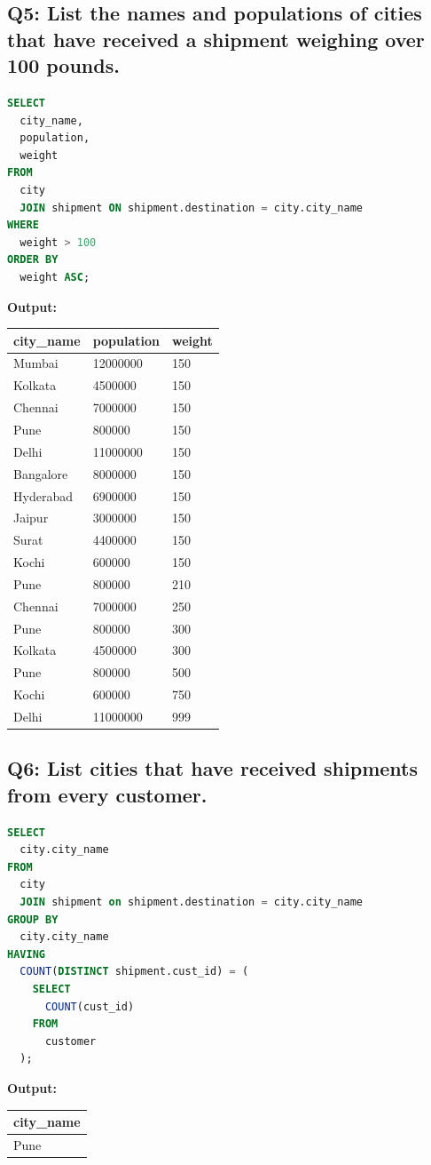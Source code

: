\documentclass[11pt, a4paper]{article}
\begin{document}
\subsection*{Q5: List the names and populations of cities that have received a shipment weighing over 100 pounds.}
\begin{lstlisting}[language=SQL]
SELECT
  city_name,
  population,
  weight
FROM
  city
  JOIN shipment ON shipment.destination = city.city_name
WHERE
  weight > 100
ORDER BY
  weight ASC;
\end{lstlisting}
\vspace{0.3cm}
\textbf{Output:}\vspace{0.2cm}
\begin{center}
\begin{tabular}{|l|l|l|}
\hline
\textbf{city\_name} & \textbf{population} & \textbf{weight} \\ \hline
Mumbai & 12000000 & 150 \\ \hline
Kolkata & 4500000 & 150 \\ \hline
Chennai & 7000000 & 150 \\ \hline
Pune & 800000 & 150 \\ \hline
Delhi & 11000000 & 150 \\ \hline
Bangalore & 8000000 & 150 \\ \hline
Hyderabad & 6900000 & 150 \\ \hline
Jaipur & 3000000 & 150 \\ \hline
Surat & 4400000 & 150 \\ \hline
Kochi & 600000 & 150 \\ \hline
Pune & 800000 & 210 \\ \hline
Chennai & 7000000 & 250 \\ \hline
Pune & 800000 & 300 \\ \hline
Kolkata & 4500000 & 300 \\ \hline
Pune & 800000 & 500 \\ \hline
Kochi & 600000 & 750 \\ \hline
Delhi & 11000000 & 999 \\ \hline
\end{tabular}
\end{center}
\newpage
\subsection*{Q6: List cities that have received shipments from every customer.}
\begin{lstlisting}[language=SQL]
SELECT
  city.city_name
FROM
  city
  JOIN shipment on shipment.destination = city.city_name
GROUP BY
  city.city_name
HAVING
  COUNT(DISTINCT shipment.cust_id) = (
    SELECT
      COUNT(cust_id)
    FROM
      customer
  );
\end{lstlisting}
\vspace{0.3cm}
\textbf{Output:}\vspace{0.2cm}
\begin{center}
\begin{tabular}{|l|}
\hline
\textbf{city\_name} \\ \hline
Pune \\ \hline
\end{tabular}
\end{center}
\newpage
\end{document}
